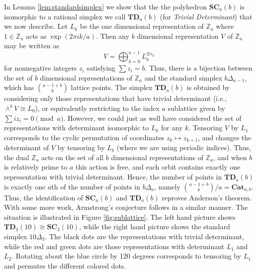 \documentclass{amsart}[12pt]
\theoremstyle{definition}
\newcommand{\Z}{\mathbb{Z}}
\newcommand{\SC}{\mathbf{SC}}
\newcommand{\TD}{\mathbf{TD}}
\newcommand{\Cat}{\mathbf{Cat}}
\begin{document}
\subsubsection{}
In Lemma \ref{lem:standardsimplex} we show that the the polyhedron $\SC_a(b)$ is isomorphic to a rational simplex we call $\TD_a(b)$ (for \emph{Trivial Determinant}) that we now describe. Let $L_k$ be the one dimensional representation of $\Z_a$ where $1\in \Z_a$ acts as $\exp(2\pi ik/a)$. Then any $b$ dimensional representation $V$ of $\Z_a$ may be written as
$$V=\bigoplus_{k=0}^{a-1} L_k^{\oplus z_k}$$
for nonnegative integers $z_i$ satisfying $\sum z_i=b$. Thus, there is a bijection between the set of $b$ dimensional representations of $\Z_a$ and the standard simplex $b\Delta_{a-1}$, which has $\binom{a-1+b}{b}$ lattice points.
The simplex $\TD_a(b)$ is obtained by considering only those representations that have trivial determinant (i.e., $\wedge^b V\cong L_0$), or equivalently restricting to the index $a$ sublattice given by $\sum iz_i=0\pmod a$.
However, we could just as well have considered the set of representations with determinant isomorphic to $L_k$ for any $k$. Tensoring $V$ by $L_1$ corresponds to the cyclic permutation of coordinates $z_k\mapsto z_{k+1}$, and changes the determinant of $V$ by tensoring by $L_b$ (where we are using periodic indices). Thus, the dual $\Z_a$ acts on the set of all $b$ dimensional representations of $\Z_a$, and when $b$ is relatively prime to $a$ this action is free, and each orbit contains exactly one representation with trivial determinant. Hence, the number of points in $\TD_a(b)$ is exactly one $a$th of the number of points in $b\Delta_a$, namely $\binom{a-1+b}{b}/a=\Cat_{a,b}$.
Thus, the identification of $\SC_a(b)$ and $\TD_a(b)$ reproves Anderson's theorem. With some more work, Armstrong's conjecture follows in a similar manner.
The situation is illustrated in Figure \ref{fig:sublattice}. The left hand picture shows $\TD_3(10)\cong \SC_3(10)$, while the right hand picture shows the standard simplex $10\Delta_3$. The black dots are the representations with trivial determinant, while the red and green dots are those representations with determinant $L_1$ and $L_2$. Rotating about the blue circle by 120 degrees corresponds to tensoring by $L_1$ and permutes the different colored dots.
\end{document}
